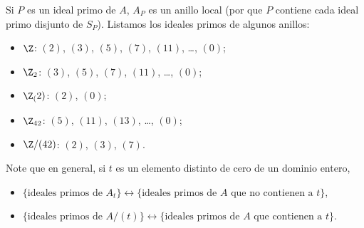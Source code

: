 \begin{example}
  Si $P$ es un ideal primo de $A$, $A_P$ es un anillo local (por que $P$ contiene cada ideal primo disjunto de $S_P$). Listamos los ideales primos de algunos anillos:
  \begin{itemize}
    \item $\Z$: $(2)$, $(3)$, $(5)$, $(7)$, $(11)$, \dots, $(0)$;
    \item $\Z_2$: $(3)$, $(5)$, $(7)$, $(11)$, \dots, $(0)$;
    \item $\Z_(2)$: $(2)$, $(0)$;
    \item $\Z_{42}$: $(5)$, $(11)$, $(13)$, \dots, $(0)$;
    \item $\Z/(42)$: $(2)$, $(3)$, $(7)$.
  \end{itemize}

  Note que en general, si $t$ es un elemento distinto de cero de un dominio entero, 
  \begin{itemize}
    \item $\{\text{ideales primos de $A_t$}\} \leftrightarrow \{\text{ideales primos de $A$ que no contienen a $t$}\}$,
    \item  $\{\text{ideales primos de $A/(t)$}\} \leftrightarrow \{\text{ideales primos de $A$ que contienen a $t$}\}$.
  \end{itemize}
\end{example}